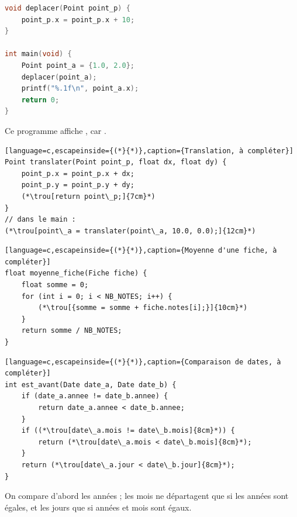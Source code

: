 \begin{UPSTIactivite}
\begin{lstlisting}[language=c,caption={Que va afficher ce programme ?},label=codePrediction]
void deplacer(Point point_p) {
    point_p.x = point_p.x + 10;
}

int main(void) {
    Point point_a = {1.0, 2.0};
    deplacer(point_a);
    printf("%.1f\n", point_a.x);
    return 0;
}
\end{lstlisting}

Ce programme affiche \trou[1.0]{1.5cm}, car .
\begin{lstlisting}[language=c,escapeinside={(*}{*)},caption={Translation, à compléter}]
Point translater(Point point_p, float dx, float dy) {
    point_p.x = point_p.x + dx;
    point_p.y = point_p.y + dy;
    (*\trou[return point\_p;]{7cm}*)
}
// dans le main :
(*\trou[point\_a = translater(point\_a, 10.0, 0.0);]{12cm}*)
\end{lstlisting}
\end{UPSTIactivite}

\begin{UPSTIactivite}
\begin{lstlisting}[language=c,escapeinside={(*}{*)},caption={Moyenne d'une fiche, à compléter}]
float moyenne_fiche(Fiche fiche) {
    float somme = 0;
    for (int i = 0; i < NB_NOTES; i++) {
        (*\trou[{somme = somme + fiche.notes[i];}]{10cm}*)
    }
    return somme / NB_NOTES;
}
\end{lstlisting}
\begin{lstlisting}[language=c,escapeinside={(*}{*)},caption={Comparaison de dates, à compléter}]
int est_avant(Date date_a, Date date_b) {
    if (date_a.annee != date_b.annee) {
        return date_a.annee < date_b.annee;
    }
    if ((*\trou[date\_a.mois != date\_b.mois]{8cm}*)) {
        return (*\trou[date\_a.mois < date\_b.mois]{8cm}*);
    }
    return (*\trou[date\_a.jour < date\_b.jour]{8cm}*);
}
\end{lstlisting}
On compare d'abord les années ; les mois ne départagent que si les années sont égales, et les jours que si années et mois sont égaux.
\end{UPSTIactivite}
